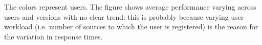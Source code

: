 The colors represent users. The figure shows average performance varying  across users and versions with no clear trend: this is probably because varying user workload (i.e. number of sources to which the user is registered) is the reason for the variation in response times. 


  
